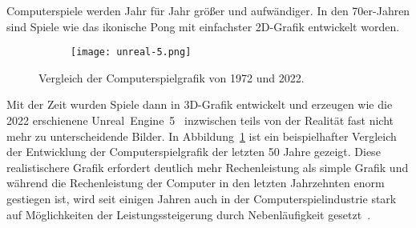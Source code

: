 
Computerspiele werden Jahr für Jahr größer und aufwändiger. In den 70er-Jahren sind Spiele wie das ikonische Pong mit einfachster 2D-Grafik entwickelt worden. 
\begin{figure}
	\begin{subfigure}[b]{.49\textwidth}
		\tikzset{external/export next=false}
	\end{subfigure}
	\begin{subfigure}[b]{.49\textwidth}
		\texttt{[image: unreal-5.png]}
	\end{subfigure}
	\caption{Vergleich der Computerspielgrafik von 1972 und 2022.}\label{fig:grafikvergleich}
\end{figure}
Mit der Zeit wurden Spiele dann in 3D-Grafik entwickelt und erzeugen wie die 2022 erschienene Unreal~Engine~5~\cite{EpicGamesInc.} inzwischen teils von der Realität fast nicht mehr zu unterscheidende Bilder. In Abbildung~\ref{fig:grafikvergleich} ist ein beispielhafter Vergleich der Entwicklung der Computerspielgrafik der letzten 50 Jahre gezeigt. Diese realistischere Grafik erfordert deutlich mehr Rechenleistung als simple Grafik und während die Rechenleistung der Computer in den letzten Jahrzehnten enorm gestiegen ist, wird seit einigen Jahren auch in der Computerspielindustrie stark auf Möglichkeiten der Leistungssteigerung durch Nebenläufigkeit gesetzt~\cite{Tatarchuk2014,Genova2015,Gyrling2015,Schott2016,Hodgman2016,White2018}.


